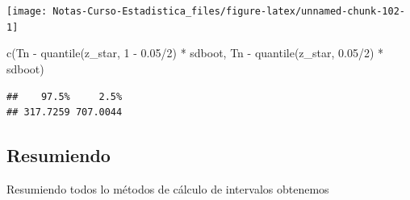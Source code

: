 \documentclass[
  12pt,
]{book}
\newenvironment{Shaded}{\begin{snugshade}}{\end{snugshade}}
\newcommand{\DecValTok}[1]{\textcolor[rgb]{0.00,0.00,0.81}{#1}}
\newcommand{\FloatTok}[1]{\textcolor[rgb]{0.00,0.00,0.81}{#1}}
\newcommand{\FunctionTok}[1]{\textcolor[rgb]{0.00,0.00,0.00}{#1}}
\newcommand{\NormalTok}[1]{#1}
\newcommand{\SpecialCharTok}[1]{\textcolor[rgb]{0.00,0.00,0.00}{#1}}
\theoremstyle{definition}
\theoremstyle{definition}
\theoremstyle{definition}
\theoremstyle{definition}
\theoremstyle{remark}
\begin{document}
\begin{center}\texttt{[image: Notas-Curso-Estadistica\_files/figure-latex/unnamed-chunk-102-1]} \end{center}

\begin{Shaded}
\begin{Highlighting}[]
\FunctionTok{c}\NormalTok{(Tn }\SpecialCharTok{{-}} \FunctionTok{quantile}\NormalTok{(z\_star, }\DecValTok{1} \SpecialCharTok{{-}} \FloatTok{0.05}\SpecialCharTok{/}\DecValTok{2}\NormalTok{) }\SpecialCharTok{*}\NormalTok{ sdboot, Tn }\SpecialCharTok{{-}}
    \FunctionTok{quantile}\NormalTok{(z\_star, }\FloatTok{0.05}\SpecialCharTok{/}\DecValTok{2}\NormalTok{) }\SpecialCharTok{*}\NormalTok{ sdboot)}
\end{Highlighting}
\end{Shaded}

\begin{verbatim}
##    97.5%     2.5% 
## 317.7259 707.0044
\end{verbatim}

\hypertarget{resumiendo}{%
\subsection{Resumiendo}\label{resumiendo}}

Resumiendo todos lo métodos de cálculo de intervalos obtenemos
\end{document}
